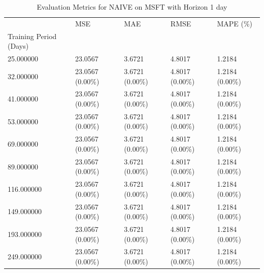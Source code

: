 \begin{table}
\caption{Evaluation Metrics for NAIVE on MSFT with Horizon 1 day}
\label{tab:naive_MSFT_h1_metrics}
\begin{tabular}{lllll}
\toprule
 & MSE & MAE & RMSE & MAPE (\%) \\
Training Period (Days) &  &  &  &  \\
\midrule
25.000000 & 23.0567 & 3.6721 & 4.8017 & 1.2184 \\
32.000000 & 23.0567 (0.00\%) & 3.6721 (0.00\%) & 4.8017 (0.00\%) & 1.2184 (0.00\%) \\
41.000000 & 23.0567 (0.00\%) & 3.6721 (0.00\%) & 4.8017 (0.00\%) & 1.2184 (0.00\%) \\
53.000000 & 23.0567 (0.00\%) & 3.6721 (0.00\%) & 4.8017 (0.00\%) & 1.2184 (0.00\%) \\
69.000000 & 23.0567 (0.00\%) & 3.6721 (0.00\%) & 4.8017 (0.00\%) & 1.2184 (0.00\%) \\
89.000000 & 23.0567 (0.00\%) & 3.6721 (0.00\%) & 4.8017 (0.00\%) & 1.2184 (0.00\%) \\
116.000000 & 23.0567 (0.00\%) & 3.6721 (0.00\%) & 4.8017 (0.00\%) & 1.2184 (0.00\%) \\
149.000000 & 23.0567 (0.00\%) & 3.6721 (0.00\%) & 4.8017 (0.00\%) & 1.2184 (0.00\%) \\
193.000000 & 23.0567 (0.00\%) & 3.6721 (0.00\%) & 4.8017 (0.00\%) & 1.2184 (0.00\%) \\
249.000000 & 23.0567 (0.00\%) & 3.6721 (0.00\%) & 4.8017 (0.00\%) & 1.2184 (0.00\%) \\
\bottomrule
\end{tabular}
\end{table}
